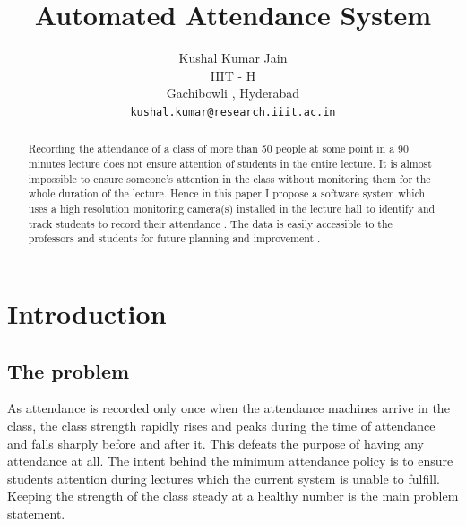 \documentclass[10pt,twocolumn,letterpaper]{article}
\begin{document}
\title{Automated Attendance System}

\author{Kushal Kumar Jain\\
IIIT - H\\
Gachibowli , Hyderabad\\
{\tt\small kushal.kumar@research.iiit.ac.in}}


\maketitle

\begin{abstract}
Recording the attendance of a class of more than 50 people at some point in a 90 minutes lecture does not ensure attention of students in the entire lecture. It is almost impossible to ensure someone's attention in the class without monitoring them for the whole duration of the lecture. Hence in this paper I propose a software system which uses a high resolution monitoring camera(s) installed in the lecture hall to identify and track students to record their attendance . The data is easily accessible to the professors and students for future planning and improvement .
\end{abstract}

\section{Introduction}


\subsection{The problem}

As attendance is recorded only once when the attendance machines arrive in the class, the class strength rapidly rises and peaks during the time of attendance and falls sharply before and after it. This defeats the purpose of having any attendance at all. The intent behind the minimum attendance policy is to ensure students attention during lectures which the current system is unable to fulfill. Keeping the strength of the class steady at a healthy number is the main problem statement.
\end{document}

